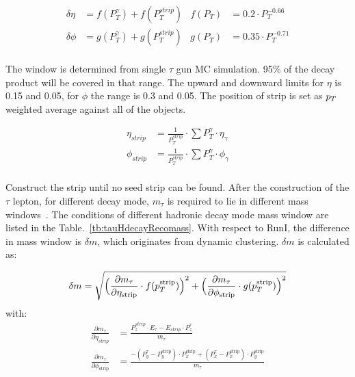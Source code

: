 \begin{align*}
\delta\eta&=f(P_{T}^{\gamma})+f(P_{T}^{strip})   & f(P_{T})&=0.2\cdot P_{T}^{-0.66}\\
\delta\phi&=g(P_{T}^{\gamma})+g(P_{T}^{strip}) & g(P_{T})&=0.35\cdot P_{T}^{-0.71}\\
\end{align*}

The window is determined from single $\tau$ gun MC simulation. 95\% of the decay product will be covered in that range. The upward and downward limits for $\eta$ is 0.15 and 0.05, for $\phi$ the range is 0.3 and 0.05.  The position of strip is set as $p_{T}$ weighted average against all of the objects. 

\begin{align*}
\eta_{strip}&=\frac{1}{P_{T}^{strip}}\cdot\sum P_{T}^{\gamma}\cdot\eta_{\gamma}\\
\phi_{strip}&=\frac{1}{P_{T}^{strip}}\cdot\sum P_{T}^{\gamma}\cdot\phi_{\gamma}\\
\end{align*}

Construct the strip until no seed strip can be found. After the construction of the $\tau$ lepton, for different decay mode, $m_{\tau}$ is required to lie in different mass windows~\cite{TauReconstuction}.  The conditions of different hadronic decay mode mass window are listed in the Table.~\ref{tb:tauHdecayRecomass}. With respect to RunI, the difference in mass window is $\delta m$, which originates from dynamic clustering. $\delta m$ is calculated as:

\begin{align*}
\delta m&=\sqrt{\Big(\frac{\partial m_{\tau}}{\partial \eta_\text{{strip}}}\cdot f(p_{T}^\text{{strip}})\Big)^{2}+\Big(\frac{\partial m_{\tau}}{\partial \phi_\text{{strip}}}\cdot g(p_{T}^\text{{strip}})\Big)^{2}}\\
\end{align*}
with:
\begin{align*}
\frac{\partial m_{\tau}}{\partial\eta_{strip}}&=\frac{P_{z}^{strip}\cdot E_{\tau}-E_{strip}\cdot P_{z}^{\tau}}{m_{\tau}}\\
\frac{\partial m_{\tau}}{\partial\phi_\text{{strip}}}&=\frac{-(P_{y}^{\tau}-P_{y}^\text{{strip}})\cdot P_{x}^\text{{strip}}+(P_{x}^{\tau}-P_{x}^\text{{strip}})\cdot P_{y}^\text{{strip}}}{m_{\tau}}
\end{align*}


